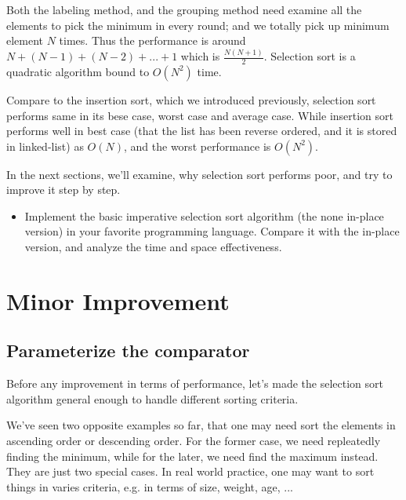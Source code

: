 \documentclass{article}
\begin{document}
Both the labeling method, and the grouping method need examine all the elements to
pick the minimum in every round; and we totally pick up minimum element $N$ times.
Thus the performance is around $N + (N-1) + (N-2) + ... + 1$ which is $\frac{N(N+1)}{2}$.
Selection sort is a quadratic algorithm bound to $O(N^2)$ time.

Compare to the insertion sort, which we introduced previously, selection sort
performs same in its bese case, worst case and average case. While insertion
sort performs well in best case (that the list has been reverse ordered, and it is stored
in linked-list) as $O(N)$, and the worst performance is $O(N^2)$. 

In the next sections, we'll examine, why selection sort performs poor, and try
to improve it step by step. 

\begin{Exercise}

\begin{itemize}
\item Implement the basic imperative selection sort algorithm (the none in-place version)
in your favorite programming language. Compare it with the in-place version, and analyze
the time and space effectiveness.
\end{itemize}

\end{Exercise}


\section{Minor Improvement}

\subsection{Parameterize the comparator}
Before any improvement in terms of performance, let's made the selection sort
algorithm general enough to handle different sorting criteria.

We've seen two opposite examples so far, that one may need sort the elements
in ascending order or descending order. For the former case, we need 
repleatedly finding the minimum, while for the later, we need find the maximum
instead. They are just two special cases. In real world practice, one 
may want to sort things in varies criteria, e.g. in terms of size, weight,
age, ... 
\end{document}
